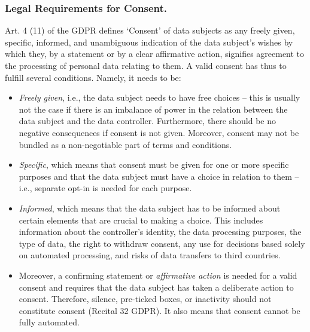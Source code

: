 \subsubsection{Legal Requirements for Consent.} 
Art. 4 (11) of the GDPR defines ‘Consent’ of data subjects as any freely given, specific, informed, and unambiguous indication of the data subject's wishes by which they, by a statement or by a clear affirmative action, signifies agreement to the processing of personal data relating to them.
A valid consent has thus to fulfill several conditions. Namely, it needs to be:
\begin{itemize}
    \item \textit{Freely given}, i.e., the data subject needs to have free choices -- this is usually not the case if there is an imbalance of power in the relation between the data subject and the data controller. Furthermore, there should be no negative consequences if consent is not given. Moreover, consent may not be bundled as a non-negotiable part of terms and conditions.
    \item \textit{Specific}, which means that consent must be given for one or more specific purposes and that the data subject must have a choice in relation to them -- i.e., separate opt-in is needed for each purpose.
    \item \textit{Informed}, which means that the data subject has to be informed about certain elements that are crucial to making a choice.  This includes information about the controller’s identity, the data processing purposes, the type of data, the right to withdraw consent, any use for decisions based solely on automated processing, and risks of data transfers to third countries.
    \item Moreover, a confirming statement or \textit{affirmative action} is needed for a valid consent and requires that the data subject has taken a deliberate action to consent. Therefore, silence, pre-ticked boxes, or inactivity should not constitute consent (Recital 32 GDPR). It also means that consent cannot be fully automated.
\end{itemize}




